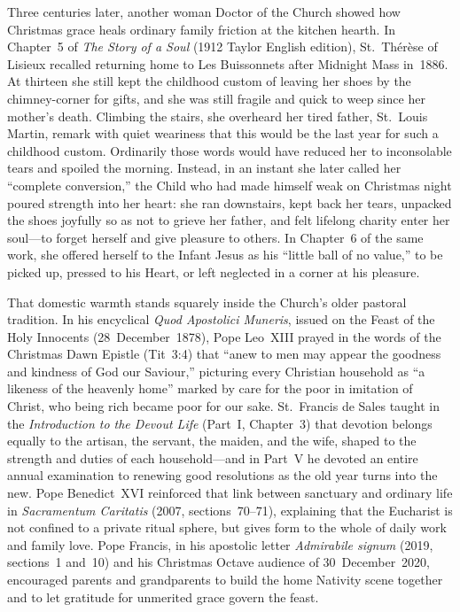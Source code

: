 Three centuries later, another woman Doctor of the Church showed how Christmas
grace heals ordinary family friction at the kitchen hearth. In Chapter~5 of
\textit{The Story of a Soul} (1912 Taylor English edition), St.~Th\'er\`ese of
Lisieux recalled returning home to Les Buissonnets after Midnight Mass in~1886.
At thirteen she still kept the childhood custom of leaving her shoes by the
chimney-corner for gifts, and she was still fragile and quick to weep since her
mother's death. Climbing the stairs, she overheard her tired father, St.~Louis
Martin, remark with quiet weariness that this would be the last year for such a
childhood custom. Ordinarily those words would have reduced her to inconsolable
tears and spoiled the morning.
Instead, in an instant she later called her ``complete conversion,'' the Child
who had made himself weak on Christmas night poured strength into her heart:
she ran downstairs, kept back her tears, unpacked the shoes joyfully so as not
to grieve her father, and felt lifelong charity enter her soul---to forget
herself and give pleasure to others. In Chapter~6 of the same work, she offered
herself to the Infant Jesus as his ``little ball of no value,'' to be picked up,
pressed to his Heart, or left neglected in a corner at his pleasure.

That domestic warmth stands squarely inside the Church's older pastoral
tradition. In his encyclical \textit{Quod Apostolici Muneris}, issued on the
Feast of the Holy Innocents (28~December~1878), Pope Leo~XIII prayed in the words
of the Christmas Dawn Epistle (Tit~3:4) that ``anew to men may appear the
goodness and kindness of God our Saviour,'' picturing every Christian household
as ``a likeness of the heavenly home'' marked by care for the poor in imitation
of Christ, who being rich became poor for our sake. St.~Francis de Sales taught
in the \textit{Introduction to the Devout Life} (Part~I, Chapter~3) that
devotion belongs equally to the artisan, the servant, the maiden, and the wife,
shaped to the strength and duties of each household---and in Part~V he devoted
an entire annual examination to renewing good resolutions as the old year turns
into the new. Pope Benedict~XVI reinforced that link between sanctuary and
ordinary life in \textit{Sacramentum Caritatis} (2007, sections~70--71),
explaining that the Eucharist is not confined to a private ritual sphere, but
gives form to the whole of daily work and family love. Pope Francis, in his
apostolic letter \textit{Admirabile signum} (2019, sections~1 and~10) and his
Christmas Octave audience of 30~December~2020, encouraged parents and
grandparents to build the home Nativity scene together and to let gratitude for
unmerited grace govern the feast.


